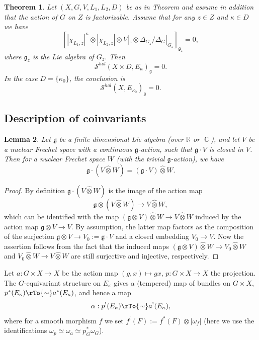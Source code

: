 \documentclass[12pt,reqno]{amsart}
\DeclareMathOperator\C{\mathbb C}
\newtheorem{theorem}{Theorem}[section]
\newtheorem{lemma}[theorem]{Lemma}
\theoremstyle{definition}
\theoremstyle{remark}
\numberwithin{equation}{section}
\newcommand{\De}{\Delta}
\newcommand{\ot}{\otimes}
\renewcommand{\SS}{{\mathcal S}}
\newcommand{\om}{\omega}
\renewcommand{\a}{\alpha}
\newcommand{\fg}{{\mathfrak g}}
\newcommand{\R}{{\mathbb R}}
\begin{document}
\begin{theorem}\label{coinv-fact-thm}
Let $(X,G,V,L_1,L_2,D)$ be as in Theorem 
and assume in addition that the action of $G$ on $Z$ is factorizable.
Assume that for any $z\in Z$ and $\kappa\in D$ we have
$$[|\chi_{L_1,z}|^{\kappa}\ot |\chi_{L_2,z}|\ot V|_z\ot \De_{G_z}/\De_G|_{G_z}]_{\fg_{z}}=0,$$
where $\fg_z$ is the Lie algebra of $G_z$.
Then 
$$\SS^{hol}(X\times D,E_{\kappa})_{\fg}=0.$$
In the case $D=\{\kappa_0\}$, the conclusion is
$$\SS^{hol}(X,E_{\kappa_0})_{\fg}=0.$$
\end{theorem}




\subsection{Description of coinvariants}

\begin{lemma}\label{Frechet-image-lem} 
Let $\fg$ be a finite dimensional Lie algebra (over $\R$ or $\C$), and
let $V$ be a nuclear Frechet space with a continuous $\fg$-action, such that $\fg\cdot V$ is closed in $V$.
Then for a nuclear Frechet space $W$ (with the trivial $\fg$-action), we have
$$\fg\cdot (V\hat{\ot} W)=(\fg\cdot V)\hat{\ot} W.$$
\end{lemma}

\begin{proof}
By definition $\fg\cdot (V\hat{\ot} W)$ is the image of the action map
$$\fg\ot (V\hat{\ot} W)\to V\hat{\ot} W,$$
which can be identified with the map $(\fg\ot V)\hat{\ot} W\to V\hat{\ot} W$
induced by the action map $\fg\ot V\to V$. By assumption, the latter map factors as the composition
of the surjection $\fg\ot V\to V_0:=\fg\cdot V$ and a closed embedding $V_0\to V$.
Now the assertion follows from the fact that the induced maps
$(\fg\ot V)\hat{\ot} W\to V_0\hat{\ot} W$ and $V_0\hat{\ot} W\to V\hat{\ot} W$ are
still surjective and injective, respectively.
\end{proof}

Let $a:G\times X\to X$ be the action map $(g,x)\mapsto gx$, $p:G\times X\to X$ the projection.
The $G$-equivariant structure on $E_{\kappa}$ gives a (tempered) map of bundles on $G\times X$,
$p^*(E_{\kappa})\rTo{\sim} a^*(E_{\kappa})$, and hence a map
$$\a:p^!(E_{\kappa})\rTo{\sim} a^!(E_{\kappa}),$$ 
where for a smooth morphism $f$ we set $f^!(F):=f^*(F)\ot |\om_f|$
(here we use the identifications $\om_p\simeq \om_a\simeq p_G^*\om_G$).
\end{document}
